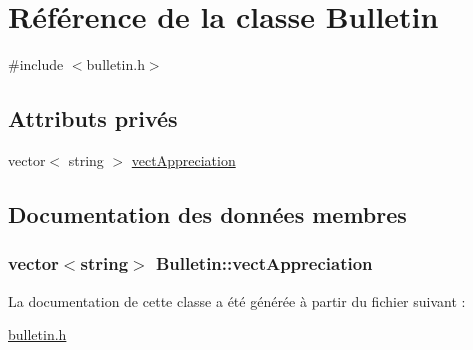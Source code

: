 \hypertarget{class_bulletin}{\section{Référence de la classe Bulletin}
\label{class_bulletin}
}


{\ttfamily \#include $<$bulletin.\+h$>$}

\subsection*{Attributs privés}
\begin{DoxyCompactItemize}
\item 
vector$<$ string $>$ \hyperlink{class_bulletin_aeca9bb7c63b6c95d13f215d7b1ae14b6}{vect\+Appreciation}
\end{DoxyCompactItemize}


\subsection{Documentation des données membres}
\hypertarget{class_bulletin_aeca9bb7c63b6c95d13f215d7b1ae14b6}{
\subsubsection[{vect\+Appreciation}]{\setlength{\rightskip}{0pt plus 5cm}vector$<$string$>$ Bulletin\+::vect\+Appreciation\hspace{0.3cm}{\ttfamily [private]}}}\label{class_bulletin_aeca9bb7c63b6c95d13f215d7b1ae14b6}


La documentation de cette classe a été générée à partir du fichier suivant \+:\begin{DoxyCompactItemize}
\item 
\hyperlink{bulletin_8h}{bulletin.\+h}\end{DoxyCompactItemize}
